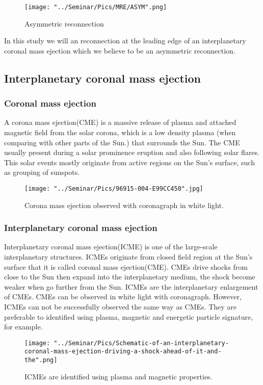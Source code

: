 \documentclass[12pt, a4paper]{article}
\begin{document}
		\begin{figure}[hbtp]
		\centering
		\texttt{[image: "../Seminar/Pics/MRE/ASYM".png]}
		\caption{Asymmetric reconnection}
		\end{figure}
		
		\newpage
	In this study we will an reconnection at the leading edge of an interplanetary coronal mass ejection which we believe to be an asymmetric reconnection.
	\subsection*{Interplanetary coronal mass ejection}
		\subsubsection*{Coronal mass ejection}
		A corona mass ejection(CME) is a massive release of plasma and attached magnetic field from the solar corona, which is a low density plasma (when comparing with other parts of the Sun.) that surrounds the Sun. The CME usually present during a solar prominence eruption and also following solar flares. This solar events mostly originate from active regions on the Sun's surface, such as grouping of sunspots.
		\begin{figure}[hbtp]
		\centering
		\texttt{[image: "../Seminar/Pics/96915-004-E99CC450".jpg]}
		\caption{Corona mass ejection observed with coronagraph in white light.}
		\end{figure}
		\newpage
		\subsubsection*{Interplanetary coronal mass ejection}
		Interplanetary coronal mass ejection(ICME) is one of the large-scale interplanetary structures. ICMEs originate from closed field region at the Sun's surface that it is called coronal mass ejection(CME). CMEs drive shocks from close to the Sun then expand into the interplanetary medium, the shock become weaker when go further from the Sun. ICMEs are the interplanetary enlargement of CMEs. CMEs can be observed in white light with coronagraph. However, ICMEs can not be successfully observed the same way as CMEs. They are preferable to identified using plasma, magnetic and energetic particle signature, for example.
		\begin{figure}[h!]
		\centering
		\texttt{[image: "../Seminar/Pics/Schematic-of-an-interplanetary-coronal-mass-ejection-driving-a-shock-ahead-of-it-and-the".png]}
		\caption{ICMEs are identified using plasma and magnetic properties.}
		\end{figure}
		
\end{document}
